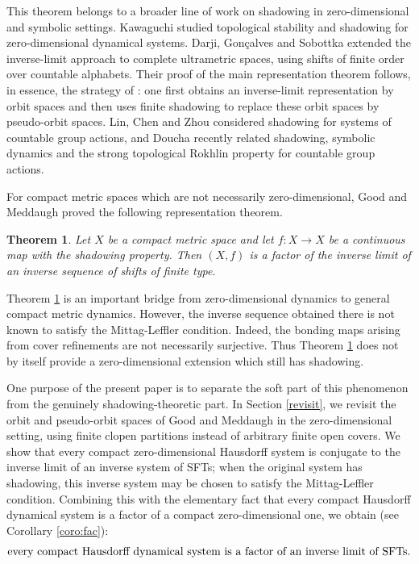 \documentclass[10pt,a4paper]{amsart}
\newtheorem{theorem}{Theorem}[section]
\numberwithin{equation}{section}
\begin{document}
This theorem belongs to a broader line of work on shadowing in
zero-dimensional and symbolic settings. Kawaguchi \cite{Kaw} studied
topological stability and shadowing for zero-dimensional dynamical systems.
Darji, Gon\c{c}alves and Sobottka \cite{Darji} extended the inverse-limit
approach to complete ultrametric spaces, using shifts of finite order over
countable alphabets. Their proof of the main representation theorem follows,
in essence, the strategy of \cite[Theorem~18]{GM}: one first obtains an
inverse-limit representation by orbit spaces and then uses finite shadowing
to replace these orbit spaces by pseudo-orbit spaces. Lin, Chen and Zhou
\cite{LCZ} considered shadowing for systems of countable group actions, and
Doucha \cite{Dou} recently related shadowing, symbolic dynamics and the strong
topological Rokhlin property for countable group actions.


For compact metric spaces which are not necessarily zero-dimensional, Good and
Meddaugh proved the following representation theorem.

\begin{theorem}\cite[Theorem 20]{GM}\label{thm:GM20}
Let $X$ be a compact metric space and let $f:X\to X$ be a continuous map with
the shadowing property. Then $(X,f)$ is a factor of the inverse limit of an
inverse sequence of shifts of finite type.
\end{theorem}

Theorem \ref{thm:GM20} is an important bridge from zero-dimensional dynamics to
general compact metric dynamics. However, the inverse sequence obtained there is
not known to satisfy the Mittag-Leffler condition. Indeed, the bonding maps
arising from cover refinements are not necessarily surjective. Thus
Theorem \ref{thm:GM20} does not by itself provide a zero-dimensional extension
which still has shadowing.

One purpose of the present paper is to separate the soft part of this phenomenon
from the genuinely shadowing-theoretic part. In Section \ref{revisit}, we revisit the orbit
and pseudo-orbit spaces of Good and Meddaugh in the zero-dimensional setting,
using finite clopen partitions instead of arbitrary finite open covers. We show
that every compact zero-dimensional Hausdorff system is conjugate to the inverse
limit of an inverse system of SFTs; when the original system has shadowing, this
inverse system may be chosen to satisfy the Mittag-Leffler condition. Combining
this with the elementary fact that every compact Hausdorff dynamical system is a
factor of a compact zero-dimensional one, we obtain (see Corollary \ref{coro:fac}):
\[
\text{\emph{every compact Hausdorff dynamical system is a factor of an inverse limit
of SFTs.}}
\]
\end{document}
